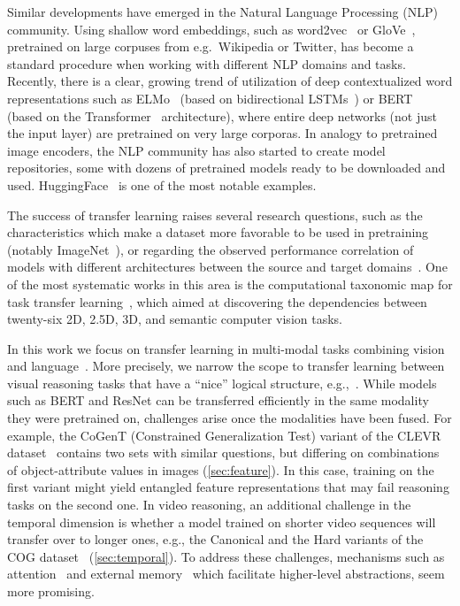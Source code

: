 Similar developments have emerged in the Natural Language Processing (NLP) community.
Using shallow word embeddings, such as word2vec~\cite{mikolov2013distributed} or GloVe~\cite{pennington2014glove}, pretrained on large corpuses from e.g.\ Wikipedia or Twitter, has become a standard procedure when working with different NLP domains and tasks.
Recently, there is a clear, growing trend of utilization of deep contextualized word representations such as ELMo~\cite{peters2018deep} (based on bidirectional LSTMs~\cite{hochreiter1997long}) or BERT~\cite{devlin2018bert} (based on the Transformer~\cite{vaswani2017attention} architecture), where entire deep networks (not just the input layer) are pretrained on very large corporas.
In analogy to pretrained image encoders, the NLP community has also started to create model repositories, some with dozens of pretrained models ready to be downloaded and used. HuggingFace~\cite{wolf2019transformers} is one of the most notable examples.

The success of transfer learning raises several research questions, such as the characteristics which make a dataset more favorable to be used in pretraining (notably ImageNet~\cite{huh2016makes}), or regarding the observed performance correlation of models with different architectures between the source and target domains~\cite{kornblith2019better}.
One of the most systematic works in this area is the computational taxonomic map for task transfer learning~\cite{zamir2018taskonomy}, which aimed at discovering the dependencies between twenty-six 2D, 2.5D, 3D, and semantic computer vision tasks.

In this work we focus on transfer learning in multi-modal tasks combining vision and language~\cite{mogadala2019trends}.
More precisely, we narrow the scope to transfer learning between visual reasoning tasks that have a ``nice'' logical structure, e.g.,~\cite{johnson2017clevr,yang2018dataset,song2018explore}. 
While models such as BERT and ResNet can be transferred efficiently in the same modality they were pretrained on, challenges arise
once the modalities have been fused.
For example, the CoGenT (Constrained Generalization Test) variant of the CLEVR dataset~\cite{johnson2017clevr}  
contains two sets with similar questions, but differing on combinations of object-attribute values in images 
(\cref{sec:feature}).
In this case, training on the first variant might yield entangled feature representations that may fail reasoning tasks
on the second one.
In video reasoning, an additional challenge in the temporal dimension is whether a model trained on shorter video sequences will 
transfer over to longer ones, e.g., the Canonical and the Hard variants of the 
COG dataset~\cite{yang2018dataset} (\cref{sec:temporal}).
To address these challenges, mechanisms such as attention~\cite{bahdanau2014neural} 
and external memory~\cite{graves2014neural, graves2016hybrid,weston2014memory} 
which facilitate higher-level abstractions, seem more promising. 

